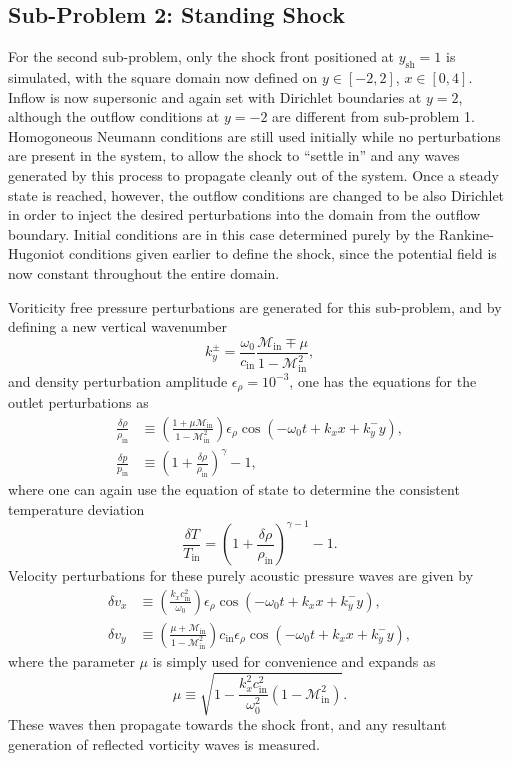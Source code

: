 \subsection{Sub-Problem 2: Standing Shock}
\label{subsec:sub_problem_2}

For the second sub-problem, only the shock front positioned at $y_\textrm{sh}=1$ is simulated, with the square domain now defined on $y\in[-2,2]$, $x\in[0,4]$. Inflow is now supersonic and again set with Dirichlet boundaries at $y=2$, although the outflow conditions at $y=-2$ are different from sub-problem 1. Homogoneous Neumann conditions are still used initially while no perturbations are present in the system, to allow the shock to ``settle in'' and any waves generated by this process to propagate cleanly out of the system. Once a steady state is reached, however, the outflow conditions are changed to be also Dirichlet in order to inject the desired perturbations into the domain from the outflow boundary. Initial conditions are in this case determined purely by the Rankine-Hugoniot conditions given earlier to define the shock, since the potential field is now constant throughout the entire domain.

Voriticity free pressure perturbations are generated for this sub-problem, and by defining a new vertical wavenumber
\begin{equation}
k_y^\pm=\frac{\omega_0}{c_\textrm{in}}\frac{\mathcal{M}_\textrm{in}\mp\mu}{1-\mathcal{M}_\textrm{in}^2},
\end{equation}
and density perturbation amplitude $\epsilon_\rho=10^{-3}$, one has the equations for the outlet perturbations as
\begin{align}
\frac{\delta\rho}{\rho_\textrm{in}}&\equiv\left(\frac{1+\mu\mathcal{M}_\textrm{in}}{1-\mathcal{M}_\textrm{in}^2}\right)\epsilon_\rho\cos\left(-\omega_0t+k_xx+k_y^-y\right), \\
\frac{\delta p}{p_\textrm{in}}&\equiv\left(1+\frac{\delta\rho}{\rho_\textrm{in}}\right)^\gamma-1,
\end{align}
where one can again use the equation of state to determine the consistent temperature deviation
\begin{equation}
\frac{\delta T}{T_\textrm{in}}=\left(1+\frac{\delta\rho}{\rho_\textrm{in}}\right)^{\gamma-1}-1.
\end{equation}
Velocity perturbations for these purely acoustic pressure waves are given by
\begin{align}
\delta v_x&\equiv\left(\frac{k_xc_\textrm{in}^2}{\omega_0}\right)\epsilon_\rho\cos\left(-\omega_0t+k_xx+k_y^-y\right), \\
\delta v_y&\equiv\left(\frac{\mu+\mathcal{M}_\textrm{in}}{1-\mathcal{M}_\textrm{in}^2}\right)c_\textrm{in}\epsilon_\rho\cos\left(-\omega_0t+k_xx+k_y^-y\right),
\end{align}
where the parameter $\mu$ is simply used for convenience and expands as
\begin{equation}
\mu\equiv\sqrt{1-\frac{k_x^2c_\textrm{in}^2}{\omega_0^2}\left(1-\mathcal{M}_\textrm{in}^2\right)}.
\end{equation}
These waves then propagate towards the shock front, and any resultant generation of reflected vorticity waves is measured.

